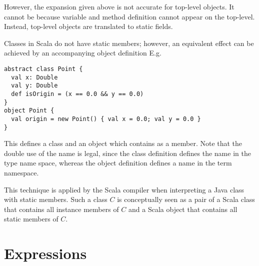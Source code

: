 However, the expansion given above is not accurate for top-level
objects. It cannot be because variable and method definition cannot
appear on the top-level. Instead, top-level objects are translated to
static fields. 

\example
Classes in Scala do not have static members; however, an equivalent
effect can be achieved by an accompanying object definition
E.g.
\begin{lstlisting}
abstract class Point {
  val x: Double 
  val y: Double 
  def isOrigin = (x == 0.0 && y == 0.0) 
}
object Point {
  val origin = new Point() { val x = 0.0; val y = 0.0 }
}
\end{lstlisting}
This defines a class  and an object  which
contains  as a member.  Note that the double use of the
name  is legal, since the class definition defines the
name  in the type name space, whereas the object
definition defines a name in the term namespace. 

This technique is applied by the Scala compiler when interpreting a
Java class with static members. Such a class $C$ is conceptually seen
as a pair of a Scala class that contains all instance members of $C$
and a Scala object that contains all static members of $C$.



\chapter{Expressions}
\label{sec:exprs}


